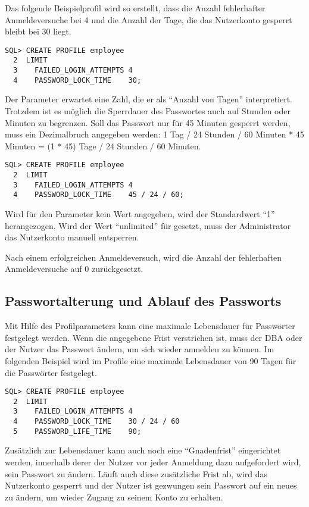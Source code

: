         Das folgende Beispielprofil wird so erstellt, dass die Anzahl fehlerhafter Anmeldeversuche bei 4 und die Anzahl der Tage, die das Nutzerkonto gesperrt bleibt bei 30 liegt.
        \begin{lstlisting}[caption={Anzahl fehlerhafter Anmeldeversuche
        konfigurieren und das Passwort 30 Tage sperren},label=admin217,language=oracle_sql]
SQL> CREATE PROFILE employee
  2  LIMIT
  3    FAILED_LOGIN_ATTEMPTS 4
  4    PASSWORD_LOCK_TIME    30;
        \end{lstlisting}
        Der Parameter  erwartet eine Zahl, die er als \enquote{Anzahl von Tagen} interpretiert. Trotzdem ist es möglich die Sperrdauer des Passwortes auch auf Stunden oder Minuten zu begrenzen. Soll das Passwort nur für 45 Minuten gesperrt werden, muss ein Dezimalbruch angegeben werden: 1 Tag / 24 Stunden / 60 Minuten * 45 Minuten = (1 * 45) Tage / 24 Stunden / 60 Minuten.
        \begin{lstlisting}[caption={Anzahl fehlerhafter Anmeldeversuche
        konfigurieren und das Passwort 45 Minuten sperren},label=admin218,language=oracle_sql]
SQL> CREATE PROFILE employee
  2  LIMIT
  3    FAILED_LOGIN_ATTEMPTS 4
  4    PASSWORD_LOCK_TIME    45 / 24 / 60;
        \end{lstlisting}
        \begin{merke}
          Wird für den Parameter  kein Wert angegeben, wird der Standardwert \enquote{1} herangezogen. Wird der Wert \enquote{unlimited} für  gesetzt, muss der Administrator das Nutzerkonto manuell
          entsperren.
        \end{merke}
        Nach einem erfolgreichen Anmeldeversuch, wird die Anzahl der fehlerhaften Anmeldeversuche auf 0 zurückgesetzt.
      \subsection{Passwortalterung und Ablauf des Passworts}
        Mit Hilfe des Profilparameters  kann eine maximale Lebensdauer für Pass\-wör\-ter festgelegt werden. Wenn die angegebene Frist verstrichen ist, muss der DBA oder der Nutzer das Passwort ändern, um sich wieder anmelden zu können. Im folgenden Beispiel wird im Profile  eine maximale Lebensdauer von 90 Tagen für die Passwörter festgelegt.
        \begin{lstlisting}[caption={Passwortlebensdauer},label=admin219,language=oracle_sql]
SQL> CREATE PROFILE employee
  2  LIMIT
  3    FAILED_LOGIN_ATTEMPTS 4
  4    PASSWORD_LOCK_TIME    30 / 24 / 60
  5    PASSWORD_LIFE_TIME    90;
        \end{lstlisting}
        Zusätzlich zur Lebensdauer kann auch noch eine \enquote{Gnadenfrist} eingerichtet werden, innerhalb derer der Nutzer vor jeder Anmeldung dazu aufgefordert wird, sein Passwort zu ändern. Läuft auch diese zusätzliche Frist ab, wird das Nutzerkonto gesperrt und der Nutzer ist gezwungen sein Passwort auf ein neues zu ändern, um wieder Zugang zu seinem Konto zu erhalten.

